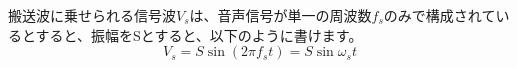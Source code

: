 搬送波に乗せられる信号波$V_s$は、音声信号が単一の周波数$f_s$のみで構成されているとすると、振幅をSとすると、以下のように書けます。
\begin{equation}
V_s = S\sin(2 \pi f_s t) = S\sin\omega_s t \label{eq:AM_sig}
\end{equation}
\begin{figure}

\end{figure}
